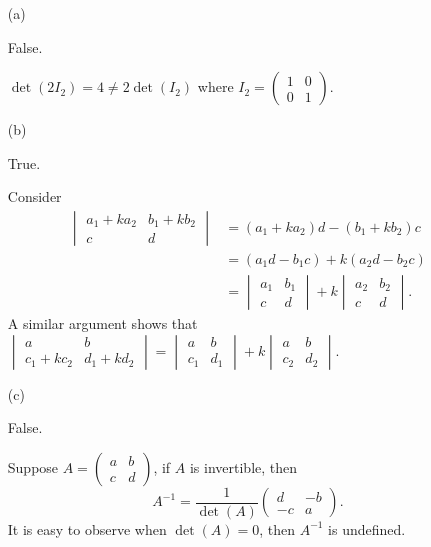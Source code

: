 \begin{Exercise}
\begin{enumerate}[(a)]
\item[(a)]
\begin{answer}
False.
\end{answer}
\begin{solution}
$\det(2I_2) = 4 \neq 2\det(I_2)$ where $I_2 = \begin{pmatrix}
1 & 0 \\
0 & 1
\end{pmatrix}$.
\end{solution}

\item[(b)]
\begin{answer}
True.
\end{answer}
\begin{solution}
Consider
\begin{align*}
\begin{vmatrix}
a_1 + k a_2 & b_1 + k b_2 \\
c & d
\end{vmatrix} 
&= (a_1 + k a_2) d - (b_1 + k b_2) c \\
&= (a_1 d - b_1 c) + k (a_2 d - b_2 c) \\
&= \begin{vmatrix}
a_1 & b_1 \\
c & d
\end{vmatrix} + k\begin{vmatrix}
a_2 & b_2 \\
c & d
\end{vmatrix}.
\end{align*}
A similar argument shows that $\begin{vmatrix}
a & b \\
c_1 + k c_2 & d_1 + k d_2
\end{vmatrix} = \begin{vmatrix}
a & b \\
c_1 & d_1
\end{vmatrix} + k\begin{vmatrix}
a & b \\
c_2 & d_2
\end{vmatrix}$.
\end{solution}

\item[(c)]
\begin{answer}
False.
\end{answer}
\begin{solution}
Suppose $A = \begin{pmatrix}
a & b \\
c & d
\end{pmatrix}$, if $A$ is invertible, then 
$$
A^{-1} = \frac{1}{\det(A)}\begin{pmatrix}
d & -b \\
-c & a
\end{pmatrix}.
$$
It is easy to observe when $\det(A) = 0$, then $A^{-1}$ is undefined.
\end{solution}


\end{enumerate}
\end{Exercise}
